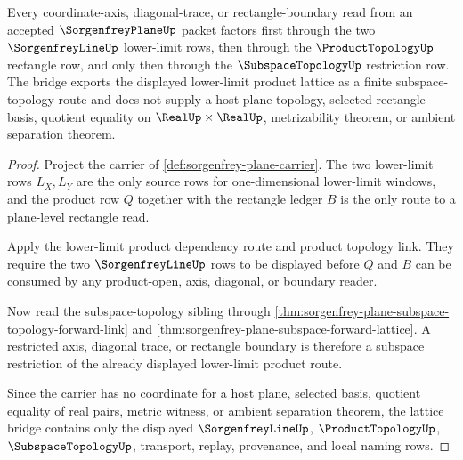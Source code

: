 \begin{theorem}
\label{thm:sorgenfrey-plane-subspace-topology-lattice-bridge}
Every coordinate-axis, diagonal-trace, or rectangle-boundary read from an accepted $\SorgenfreyPlaneUp$ packet factors first through the two $\SorgenfreyLineUp$ lower-limit rows, then through the $\ProductTopologyUp$ rectangle row, and only then through the $\SubspaceTopologyUp$ restriction row. The bridge exports the displayed lower-limit product lattice as a finite subspace-topology route and does not supply a host plane topology, selected rectangle basis, quotient equality on $\RealUp\times\RealUp$, metrizability theorem, or ambient separation theorem.
\end{theorem}
\begin{proof}
Project the carrier of \autoref{def:sorgenfrey-plane-carrier}. The two lower-limit rows $L_X,L_Y$ are the only source rows for one-dimensional lower-limit windows, and the product row $Q$ together with the rectangle ledger $B$ is the only route to a plane-level rectangle read.

Apply the lower-limit product dependency route and product topology link. They require the two $\SorgenfreyLineUp$ rows to be displayed before $Q$ and $B$ can be consumed by any product-open, axis, diagonal, or boundary reader.

Now read the subspace-topology sibling through \autoref{thm:sorgenfrey-plane-subspace-topology-forward-link} and \autoref{thm:sorgenfrey-plane-subspace-forward-lattice}. A restricted axis, diagonal trace, or rectangle boundary is therefore a subspace restriction of the already displayed lower-limit product route.

Since the carrier has no coordinate for a host plane, selected basis, quotient equality of real pairs, metric witness, or ambient separation theorem, the lattice bridge contains only the displayed $\SorgenfreyLineUp$, $\ProductTopologyUp$, $\SubspaceTopologyUp$, transport, replay, provenance, and local naming rows.
\end{proof}
